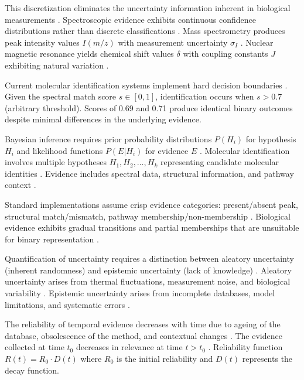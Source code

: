 \documentclass[12pt,a4paper]{article}
\begin{document}
This discretization eliminates the uncertainty information inherent in biological measurements \cite{kidd2014uncertainty}. Spectroscopic evidence exhibits continuous confidence distributions rather than discrete classifications \cite{stein2014mass}. Mass spectrometry produces peak intensity values $I(m/z)$ with measurement uncertainty $\sigma_I$ \cite{hoffmann2007mass}. Nuclear magnetic resonance yields chemical shift values $\delta$ with coupling constants $J$ exhibiting natural variation \cite{claridge2016high}.

Current molecular identification systems implement hard decision boundaries \cite{kind2007fiehnlib, horai2010massbank}. Given the spectral match score $s \in [0,1]$, identification occurs when $s > 0.7$ (arbitrary threshold). Scores of 0.69 and 0.71 produce identical binary outcomes despite minimal differences in the underlying evidence.

Bayesian inference requires prior probability distributions $P(H_i)$ for hypothesis $H_i$ and likelihood functions $P(E|H_i)$ for evidence $E$ \cite{gelman2013bayesian}. Molecular identification involves multiple hypotheses $H_1, H_2, \ldots, H_k$ representing candidate molecular identities \cite{wolfender2019accelerating}. Evidence includes spectral data, structural information, and pathway context \cite{dunn2013mass}.

Standard implementations assume crisp evidence categories: present/absent peak, structural match/mismatch, pathway membership/non-membership \cite{rogers2019application}. Biological evidence exhibits gradual transitions and partial memberships that are unsuitable for binary representation \cite{zadeh1965fuzzy}.

Quantification of uncertainty requires a distinction between aleatory uncertainty (inherent randomness) and epistemic uncertainty (lack of knowledge) \cite{kiureghian2009aleatory}. Aleatory uncertainty arises from thermal fluctuations, measurement noise, and biological variability \cite{vanderwerf2005uncertainty}. Epistemic uncertainty arises from incomplete databases, model limitations, and systematic errors \cite{helton2004alternative}.

The reliability of temporal evidence decreases with time due to ageing of the database, obsolescence of the method, and contextual changes \cite{guha2005chemical}. The evidence collected at time $t_0$ decreases in relevance at time $t > t_0$ \cite{steinbeck2003chemical}. Reliability function $R(t) = R_0 \cdot D(t)$ where $R_0$ is the initial reliability and $D(t)$ represents the decay function.
\end{document}
